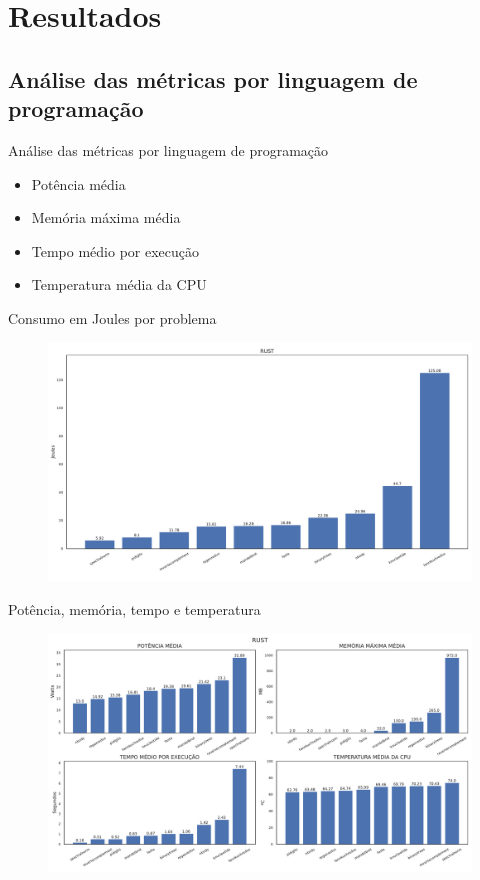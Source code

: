 \section{Resultados}

\subsection{Análise das métricas por linguagem de programação}
\begin{frame}{Análise das métricas por linguagem de programação}
    \begin{itemize}
        \item Potência média
        \item Memória máxima média
        \item Tempo médio por execução
        \item Temperatura média da CPU
    \end{itemize}
\end{frame}

\begin{frame}{Consumo em Joules por problema}
    \begin{figure}
        \centering
        \includegraphics[width=0.85\linewidth]{images/rust-1.pdf}
        \label{fig:powerDomains2c3s4}
    \end{figure}
\end{frame}

\begin{frame}{Potência, memória, tempo e temperatura}
    \begin{figure}
        \centering
        \includegraphics[width=0.85\linewidth]{images/rust-2.pdf}
        \label{fig:powerDomainsrusat2c3s4}
    \end{figure}
\end{frame}


